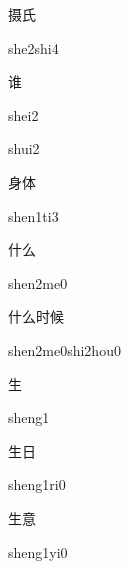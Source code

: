 \begin{multicols*}{2}
\begin{verbete}{摄氏}
\begin{pronuncia}{she2shi4}
\end{pronuncia}
\end{verbete}

\begin{verbete}[shei2]{谁}
\begin{pronuncia}{shei2}
\end{pronuncia}
\begin{pronuncia}{shui2}
\end{pronuncia}
\end{verbete}

\begin{verbete}[shen1ti3]{身体}
\begin{pronuncia}{shen1ti3}
\end{pronuncia}
\end{verbete}

\begin{verbete}[shen2me0]{什么}
\begin{pronuncia}{shen2me0}
\end{pronuncia}
\end{verbete}

\begin{verbete}{什么时候}
\begin{pronuncia}{shen2me0shi2hou0}
\end{pronuncia}
\end{verbete}

\begin{verbete}[sheng1]{生}
\begin{pronuncia}{sheng1}
\end{pronuncia}
\end{verbete}

\begin{verbete}[sheng1ri0]{生日}
\begin{pronuncia}{sheng1ri0}
\end{pronuncia}
\end{verbete}

\begin{verbete}[sheng1yi0]{生意}
\begin{pronuncia}{sheng1yi0}
\end{pronuncia}
\end{verbete}


\end{multicols*}
